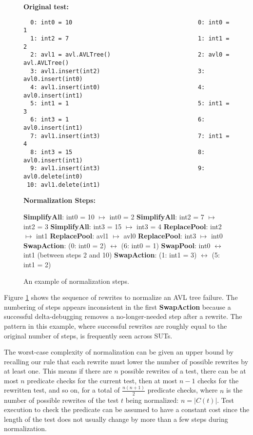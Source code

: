 \begin{figure}
\raggedright
{\bf Original test:}\hspace{1.5in}{\bf Normalized:}
{\scriptsize
\begin{verbatim}
  0: int0 = 10                                    0: int0 = 1
  1: int2 = 7                                     1: int1 = 2
  2: avl1 = avl.AVLTree()                         2: avl0 = avl.AVLTree()
  3: avl1.insert(int2)                            3: avl0.insert(int0) 
  4: avl1.insert(int0)                            4: avl0.insert(int1) 
  5: int1 = 1                                     5: int1 = 3
  6: int3 = 1                                     6: avl0.insert(int1) 
  7: avl1.insert(int3)                            7: int1 = 4
  8: int3 = 15                                    8: avl0.insert(int1)
  9: avl1.insert(int3)                            9: avl0.delete(int0)
 10: avl1.delete(int1) 
\end{verbatim}
}
{\bf Normalization Steps:}
\raggedright
\begin{code}
{\bf SimplifyAll}: int0 = 10 $\mapsto$ int0 = 2 
{\bf SimplifyAll}: int2 = 7  $\mapsto$ int2 = 3 
{\bf SimplifyAll}: int3 = 15  $\mapsto$ int3 = 4 
{\bf ReplacePool}: int2 $\mapsto$ int1
{\bf ReplacePool}: avl1 $\mapsto$ avl0
{\bf ReplacePool}: int3 $\mapsto$ int0
{\bf SwapAction}: (0: int0 = 2)  $\leftrightarrow$ (6: int0 = 1)
{\bf SwapPool}: int0 $\leftrightarrow$ int1 (between steps 2 and 10)
{\bf SwapAction}: (1: int1 = 3)  $\leftrightarrow$ (5: int1 = 2)
\end{code}

\caption{An example of normalization steps.}
\label{diffnorm}
\end{figure}

Figure \ref{diffnorm} shows the sequence of rewrites to
normalize an AVL tree failure.  The numbering
of steps appears inconsistent in the first {\bf SwapAction} because a
successful delta-debugging removes a no-longer-needed step after a
rewrite.  The pattern in this example, where successful rewrites
are roughly equal to the original number of steps, is frequently seen across SUTs.

The worst-case complexity of normalization can be given an upper bound by recalling our
rule that each rewrite must lower the number of possible rewrites by
at least one.  This means if there are $n$ possible rewrites of a
test, there can be at most $n$ predicate checks for the current test,
then at most $n-1$ checks for the rewritten test, and so on, for
a total of $\frac{n(n+1)}{2}$ predicate checks, where $n$ is the
number of possible rewrites of the test $t$ being normalized:
$n = |C(t)|$.  Test execution to check the predicate can be
assumed to have a constant cost since the length of the test does
not usually change by more than a few steps during normalization. 

